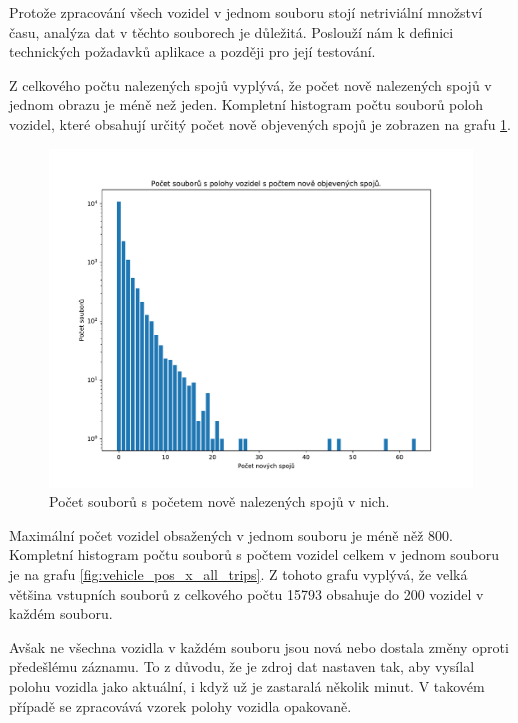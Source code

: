 Protože zpracování všech vozidel v jednom souboru stojí netriviální množství času, analýza dat v těchto souborech je důležitá. Poslouží nám k definici technických požadavků aplikace a později pro její testování.

\bigbreak

Z celkového počtu nalezených spojů vyplývá, že počet nově nalezených spojů v jednom obrazu je méně než jeden. Kompletní histogram počtu souborů poloh vozidel, které obsahují určitý počet nově objevených spojů je zobrazen na grafu \ref{fig:vehicle_pos_x_new_trips}.

\begin{figure}
	\centering
  \includegraphics[width=0.7\linewidth]{../img/vehicle_pos_x_new_trips}
  \caption{Počet souborů s početem nově nalezených spojů v nich.}
  \label{fig:vehicle_pos_x_new_trips}
\end{figure}

\bigbreak

Maximální počet vozidel obsažených v jednom souboru je méně něž 800. Kompletní histogram počtu souborů s počtem vozidel celkem v jednom souboru je na grafu \ref{fig:vehicle_pos_x_all_trips}. Z tohoto grafu vyplývá, že velká většina vstupních souborů z celkového počtu 15793 obsahuje do 200 vozidel v každém souboru.

\bigbreak

Avšak ne všechna vozidla v každém souboru jsou nová nebo dostala změny oproti předešlému záznamu. To z důvodu, že je zdroj dat nastaven tak, aby vysílal polohu vozidla jako aktuální, i když už je zastaralá několik minut. V takovém případě se zpracovává vzorek polohy vozidla opakovaně.

